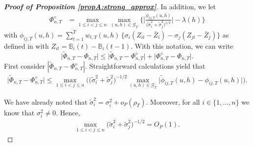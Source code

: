 \documentclass[a4paper,12pt]{article}
\makeatletter
\renewcommand{\eqref}[1]{\tagform@{\ref{#1}}}
\makeatother
\begin{document}
\begin{proof}[\textnormal{\textbf{Proof of Proposition \ref{propA:strong_approx}}}]
In addition, we let
\begin{align*}
\Phi_{n, T}^{\diamond} & = \max_{1\leq i< j \leq n}\max_{(u,h) \in \mathcal{G}_T} \bigg\{ \bigg|\frac{\phi_{ij, T}(u,h)}{\big(\widetilde{\sigma}_i^2 + \widetilde{\sigma}_j^2 \big)^{1/2}}\bigg| - \lambda(h) \bigg\} 
\end{align*}
with $\phi_{ij,T}(u,h) = \sum\nolimits_{t=1}^T w_{t,T}(u,h) \, \big\{ \sigma_i (Z_{it} - \bar{Z}_i) - \sigma_j (Z_{jt} - \bar{Z}_j) \big\}
$ as defined in \eqref{eq:phi_ij} with $Z_{it} = \mathbb{B}_i(t) - \mathbb{B}_i(t-1)$. With this notation, we can write 
\begin{equation}\label{eq-strongapprox-bound1}
\big| \widetilde{\Phi}_{n, T} - \Phi_{n, T} \big| \le \big| \widetilde{\Phi}_{n, T} - \Phi_{n, T}^{\diamond} \big| + \big| \Phi_{n, T}^{\diamond} - \Phi_{n, T} \big|. 
\end{equation}
First consider $|\widetilde{\Phi}_{n, T} - \Phi_{n, T}^{\diamond}|$. Straightforward calculations yield that 
\begin{align}\label{eqA:strong_approx:bound2}
\big| \widetilde{\Phi}_{n, T} - \Phi_{n, T}^{\diamond} \big| \le  \max_{1\le i < j \le n} \Big(\big(\widetilde{\sigma}_i^2 + \widetilde{\sigma}_j^2 \big)^{-1/2} \max_{(u,h) \in \mathcal{G}_T} \big| \widetilde{\phi}_{ij, T}(u,h) - \phi_{ij, T}(u,h) \big|\Big).
\end{align}

We have already noted that $\widetilde{\sigma}_i^2 = \sigma_i^2 + o_P(\rho_T)$. Moreover, for all $i \in \{1, \ldots, n\}$ we know that $\sigma_i^2 \neq 0$. Hence, 
\begin{align}\label{eqA:strong_approx:bound3}
\max_{1\le i < j \le n}\big(\widetilde{\sigma}_i^2+ \widetilde{\sigma}_j^2 \big)^{-1/2}  = O_P(1).
\end{align}


\end{proof}
\end{document}
